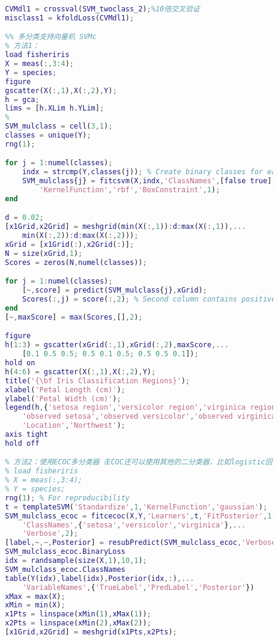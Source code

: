 \begin{lstlisting}[language=Matlab]
        % 4、分类错误率
        CVMdl1 = crossval(SVM_twoclass_2);%10倍交叉验证
        misclass1 = kfoldLoss(CVMdl1);

        %% 多分类支持向量机 SVMc
        % 方法1：
        load fisheriris
        X = meas(:,3:4);
        Y = species;
        figure
        gscatter(X(:,1),X(:,2),Y);
        h = gca;
        lims = [h.XLim h.YLim];
        %
        SVM_mulclass = cell(3,1);
        classes = unique(Y);
        rng(1);

        for j = 1:numel(classes);
            indx = strcmp(Y,classes(j)); % Create binary classes for each classifier
            SVM_mulclass{j} = fitcsvm(X,indx,'ClassNames',[false true],'Standardize',true,...
                'KernelFunction','rbf','BoxConstraint',1);
        end

        d = 0.02;
        [x1Grid,x2Grid] = meshgrid(min(X(:,1)):d:max(X(:,1)),...
            min(X(:,2)):d:max(X(:,2)));
        xGrid = [x1Grid(:),x2Grid(:)];
        N = size(xGrid,1);
        Scores = zeros(N,numel(classes));

        for j = 1:numel(classes);
            [~,score] = predict(SVM_mulclass{j},xGrid);
            Scores(:,j) = score(:,2); % Second column contains positive-class scores
        end
        [~,maxScore] = max(Scores,[],2);

        figure
        h(1:3) = gscatter(xGrid(:,1),xGrid(:,2),maxScore,...
            [0.1 0.5 0.5; 0.5 0.1 0.5; 0.5 0.5 0.1]);
        hold on
        h(4:6) = gscatter(X(:,1),X(:,2),Y);
        title('{\bf Iris Classification Regions}');
        xlabel('Petal Length (cm)');
        ylabel('Petal Width (cm)');
        legend(h,{'setosa region','versicolor region','virginica region',...
            'observed setosa','observed versicolor','observed virginica'},...
            'Location','Northwest');
        axis tight
        hold off

        % 方法2：使用ECOC多分类器（ECOC还可以使用其他的二分类器，比如logistic回归）
        % load fisheriris
        % X = meas(:,3:4);
        % Y = species;
        rng(1); % For reproducibility
        t = templateSVM('Standardize',1,'KernelFunction','gaussian');
        SVM_mulclass_ecoc = fitcecoc(X,Y,'Learners',t,'FitPosterior',1,...
            'ClassNames',{'setosa','versicolor','virginica'},...
            'Verbose',2);
        [label,~,~,Posterior] = resubPredict(SVM_mulclass_ecoc,'Verbose',1);
        SVM_mulclass_ecoc.BinaryLoss
        idx = randsample(size(X,1),10,1);
        SVM_mulclass_ecoc.ClassNames
        table(Y(idx),label(idx),Posterior(idx,:),...
            'VariableNames',{'TrueLabel','PredLabel','Posterior'})
        xMax = max(X);
        xMin = min(X);
        x1Pts = linspace(xMin(1),xMax(1));
        x2Pts = linspace(xMin(2),xMax(2));
        [x1Grid,x2Grid] = meshgrid(x1Pts,x2Pts);


\end{lstlisting}
